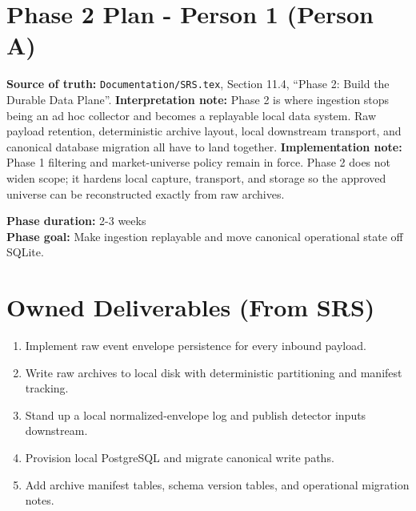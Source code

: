 \documentclass{article}
\begin{document}
\section*{Phase 2 Plan - Person 1 (Person A)}

\textbf{Source of truth:} \texttt{Documentation/SRS.tex}, Section 11.4, ``Phase 2: Build the Durable Data Plane''.
\textbf{Interpretation note:} Phase 2 is where ingestion stops being an ad hoc collector and becomes a replayable local data system. Raw payload retention, deterministic archive layout, local downstream transport, and canonical database migration all have to land together.
\textbf{Implementation note:} Phase 1 filtering and market-universe policy remain in force. Phase 2 does not widen scope; it hardens local capture, transport, and storage so the approved universe can be reconstructed exactly from raw archives.

\textbf{Phase duration:} 2-3 weeks\\
\textbf{Phase goal:} Make ingestion replayable and move canonical operational state off SQLite.

\section*{Owned Deliverables (From SRS)}
\begin{enumerate}
\item Implement raw event envelope persistence for every inbound payload.
\item Write raw archives to local disk with deterministic partitioning and manifest tracking.
\item Stand up a local normalized-envelope log and publish detector inputs downstream.
\item Provision local PostgreSQL and migrate canonical write paths.
\item Add archive manifest tables, schema version tables, and operational migration notes.
\end{enumerate}
\end{document}
